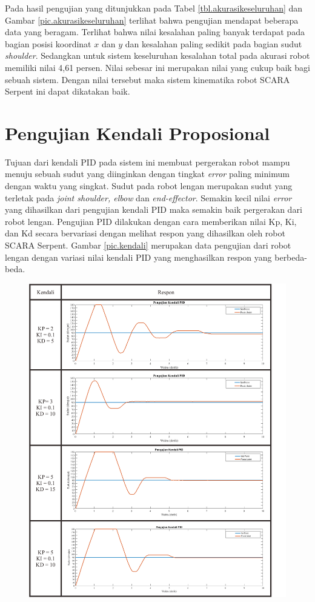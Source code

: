 Pada hasil pengujian yang ditunjukkan pada Tabel \ref{tbl.akurasikeseluruhan} dan Gambar \ref{pic.akurasikeseluruhan} terlihat bahwa pengujian mendapat beberapa data yang beragam. Terlihat bahwa nilai kesalahan paling banyak terdapat pada bagian posisi koordinat $x$ dan $y$ dan kesalahan paling sedikit pada bagian sudut \textit{shoulder}. Sedangkan untuk sistem keseluruhan kesalahan total pada akurasi robot memiliki nilai 4,61 persen. Nilai sebesar ini merupakan nilai yang cukup baik bagi sebuah sistem. Dengan nilai tersebut maka sistem kinematika robot SCARA Serpent ini dapat dikatakan baik. 


\section{Pengujian Kendali Proposional}
Tujuan dari kendali PID pada sistem ini membuat pergerakan robot mampu menuju sebuah sudut yang diinginkan dengan tingkat \textit{error} paling minimum dengan waktu yang singkat. Sudut pada robot lengan merupakan sudut yang terletak pada \textit{joint shoulder, elbow} dan \textit{end-effector}. Semakin kecil nilai \textit{error} yang dihasilkan dari pengujian kendali PID maka semakin baik pergerakan dari robot lengan. Pengujian PID dilakukan dengan cara memberikan nilai Kp, Ki, dan Kd secara bervariasi dengan melihat respon yang dihasilkan oleh robot SCARA Serpent. Gambar \ref{pic.kendali} merupakan data pengujian dari robot lengan dengan variasi nilai kendali PID yang menghasilkan respon yang berbeda-beda.


\begin{figure}[H]
	\centering
	\includegraphics[width=\textwidth,height=\textheight,keepaspectratio]{gambar/kendali1.png}
\end{figure}

